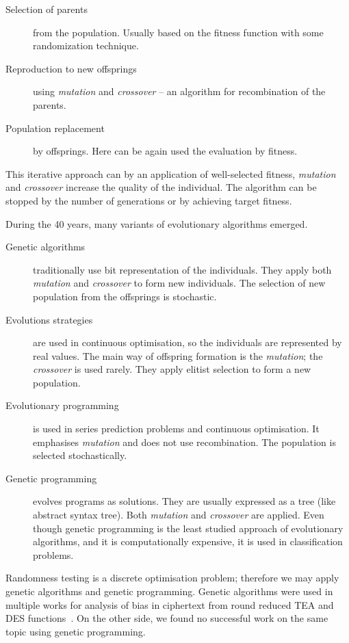 \documentclass[
  print, %
  Table,   %
  nolof,     %
  nolot,     %
  11pt, %
  oneside  %
]{fithesis3}
\begin{document}
\begin{description}
    \item[Selection of parents] from the population. Usually based on the fitness function with some randomization technique.
    \item[Reproduction to new offsprings] using \textit{mutation} and \textit{crossover} -- an algorithm for recombination of the parents.
    \item[Population replacement] by offsprings. Here can be again used the evaluation by fitness. 
\end{description}

This iterative approach can by an application of well-selected fitness, \textit{mutation} and \textit{crossover} increase the quality of the individual. The algorithm can be stopped by the number of generations or by achieving target fitness.

During the 40 years, many variants of evolutionary algorithms emerged.

\begin{description}
    \item[Genetic algorithms] traditionally use bit representation of the individuals. They apply both \textit{mutation} and \textit{crossover} to form new individuals. The selection of new population from the offsprings is stochastic.
    \item[Evolutions strategies] are used in continuous optimisation, so the individuals are represented by real values. The main way of offspring formation is the \textit{mutation}; the \textit{crossover} is used rarely. They apply elitist selection to form a new population.
    \item[Evolutionary programming] is used in series prediction problems and continuous optimisation. It emphasises \textit{mutation} and does not use recombination. The population is selected stochastically.
    \item[Genetic programming] evolves programs as solutions. They are usually expressed as a tree (like abstract syntax tree). Both \textit{mutation} and \textit{crossover} are applied. Even though genetic programming is the least studied approach of evolutionary algorithms, and it is computationally expensive, it is used in classification problems.
\end{description}

Randomness testing is a discrete optimisation problem; therefore we may apply genetic algorithms and genetic programming. Genetic algorithms were used in multiple works for analysis of bias in ciphertext from round reduced TEA and DES functions~\cite{twoRoundsTea,fourRoundsTea,fiveRoundsTea,song2007cryptanalysis,husein2007genetic}. On the other side, we found no successful work on the same topic using genetic programming.
\end{document}
